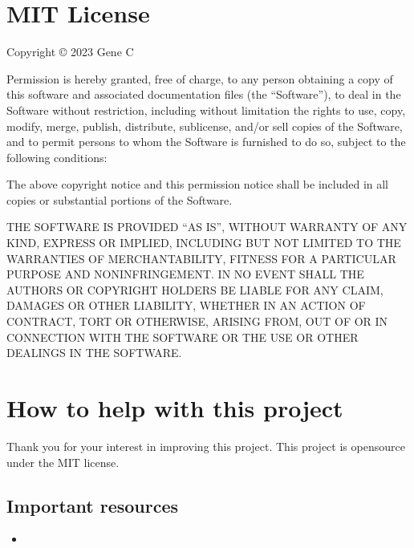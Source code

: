 \documentclass[letterpaper,10pt,english]{sphinxmanual}
\begin{document}
\begin{sphinxVerbatim}[commandchars=\\\{\}]
 
\end{sphinxVerbatim}

\sphinxstepscope


\chapter{MIT License}
\label{\detokenize{License:mit-license}}\label{\detokenize{License::doc}}
\sphinxAtStartPar
Copyright © 2023 Gene C

\sphinxAtStartPar
Permission is hereby granted, free of charge, to any person obtaining a copy
of this software and associated documentation files (the “Software”), to deal
in the Software without restriction, including without limitation the rights
to use, copy, modify, merge, publish, distribute, sublicense, and/or sell
copies of the Software, and to permit persons to whom the Software is
furnished to do so, subject to the following conditions:

\sphinxAtStartPar
The above copyright notice and this permission notice shall be included in all
copies or substantial portions of the Software.

\sphinxAtStartPar
THE SOFTWARE IS PROVIDED “AS IS”, WITHOUT WARRANTY OF ANY KIND, EXPRESS OR
IMPLIED, INCLUDING BUT NOT LIMITED TO THE WARRANTIES OF MERCHANTABILITY,
FITNESS FOR A PARTICULAR PURPOSE AND NONINFRINGEMENT. IN NO EVENT SHALL THE
AUTHORS OR COPYRIGHT HOLDERS BE LIABLE FOR ANY CLAIM, DAMAGES OR OTHER
LIABILITY, WHETHER IN AN ACTION OF CONTRACT, TORT OR OTHERWISE, ARISING FROM,
OUT OF OR IN CONNECTION WITH THE SOFTWARE OR THE USE OR OTHER DEALINGS IN THE
SOFTWARE.

\sphinxstepscope


\chapter{How to help with this project}
\label{\detokenize{Contributing:how-to-help-with-this-project}}\label{\detokenize{Contributing::doc}}
\sphinxAtStartPar
Thank you for your interest in improving this project.
This project is open\sphinxhyphen{}source under the MIT license.


\section{Important resources}
\label{\detokenize{Contributing:important-resources}}\begin{itemize}
\item {} 
\sphinxAtStartPar
{}

\end{itemize}
\end{document}

